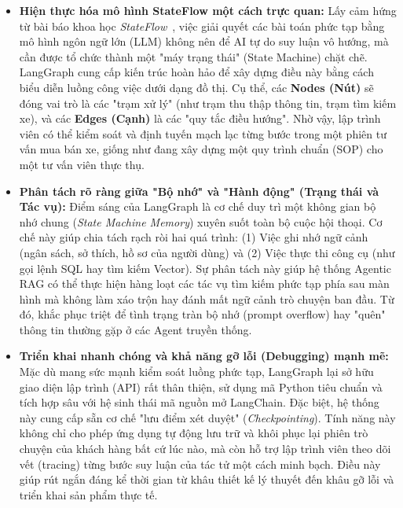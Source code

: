 \begin{itemize}
    \item \textbf{Hiện thực hóa mô hình StateFlow một cách trực quan:} Lấy cảm hứng từ bài báo khoa học \textit{StateFlow}~\cite{wu2024stateflow}, việc giải quyết các bài toán phức tạp bằng mô hình ngôn ngữ lớn (LLM) không nên để AI tự do suy luận vô hướng, mà cần được tổ chức thành một "máy trạng thái" (State Machine) chặt chẽ. LangGraph cung cấp kiến trúc hoàn hảo để xây dựng điều này bằng cách biểu diễn luồng công việc dưới dạng đồ thị. Cụ thể, các \textbf{Nodes (Nút)} sẽ đóng vai trò là các "trạm xử lý" (như trạm thu thập thông tin, trạm tìm kiếm xe), và các \textbf{Edges (Cạnh)} là các "quy tắc điều hướng". Nhờ vậy, lập trình viên có thể kiểm soát và định tuyến mạch lạc từng bước trong một phiên tư vấn mua bán xe, giống như đang xây dựng một quy trình chuẩn (SOP) cho một tư vấn viên thực thụ.
    
    \item \textbf{Phân tách rõ ràng giữa "Bộ nhớ" và "Hành động" (Trạng thái và Tác vụ):} Điểm sáng của LangGraph là cơ chế duy trì một không gian bộ nhớ chung (\textit{State Machine Memory}) xuyên suốt toàn bộ cuộc hội thoại. Cơ chế này giúp chia tách rạch ròi hai quá trình: (1) Việc ghi nhớ ngữ cảnh (ngân sách, sở thích, hồ sơ của người dùng) và (2) Việc thực thi công cụ (như gọi lệnh SQL hay tìm kiếm Vector). Sự phân tách này giúp hệ thống Agentic RAG có thể thực hiện hàng loạt các tác vụ tìm kiếm phức tạp phía sau màn hình mà không làm xáo trộn hay đánh mất ngữ cảnh trò chuyện ban đầu. Từ đó, khắc phục triệt để tình trạng tràn bộ nhớ (prompt overflow) hay "quên" thông tin thường gặp ở các Agent truyền thống.

    \item \textbf{Triển khai nhanh chóng và khả năng gỡ lỗi (Debugging) mạnh mẽ:} Mặc dù mang sức mạnh kiểm soát luồng phức tạp, LangGraph lại sở hữu giao diện lập trình (API) rất thân thiện, sử dụng mã Python tiêu chuẩn và tích hợp sâu với hệ sinh thái mã nguồn mở LangChain. Đặc biệt, hệ thống này cung cấp sẵn cơ chế "lưu điểm xét duyệt" (\textit{Checkpointing}). Tính năng này không chỉ cho phép ứng dụng tự động lưu trữ và khôi phục lại phiên trò chuyện của khách hàng bất cứ lúc nào, mà còn hỗ trợ lập trình viên theo dõi vết (tracing) từng bước suy luận của tác tử một cách minh bạch. Điều này giúp rút ngắn đáng kể thời gian từ khâu thiết kế lý thuyết đến khâu gỡ lỗi và triển khai sản phẩm thực tế.

\end{itemize}

